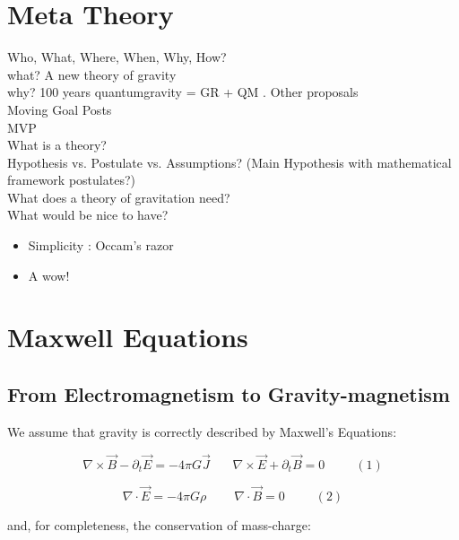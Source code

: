 \documentclass {article}
\begin{document}
\section{Meta Theory}


Who, What, Where, When, Why, How?
\\[0.15in]
what?    A new theory of  gravity
\\
why?   100 years quantumgravity = GR + QM . Other proposals
\\[1in]

Moving Goal Posts
\\

MVP
\\

What is a theory?
\\[1in]

Hypothesis vs. Postulate vs. Assumptions? (Main Hypothesis with mathematical framework postulates?)
\\[1in]



What does a theory of gravitation need?
\\[2in]

What would be nice to have? 
\begin{itemize}
	\item Simplicity : Occam's razor
	\item A wow!
\end{itemize}

\vspace{10pt}





\newpage


\section{Maxwell Equations}
\subsection{From Electromagnetism to Gravity-magnetism}

We assume that gravity is correctly described by Maxwell's Equations:

$$\nabla \times \vec B  - \partial_t \vec E  = -4 \pi G \vec J ~~~~~~~~ \nabla \times \vec E + \partial_t \vec B = 0    ~~~~~~~~~~~ (1)$$

$$\nabla \cdot \vec E = -4 \pi G \rho ~~~~~~~~~~ \nabla \cdot \vec B = 0   ~~~~~~~~~~~ (2)$$

and, for completeness, the conservation of mass-charge:
\end{document}
